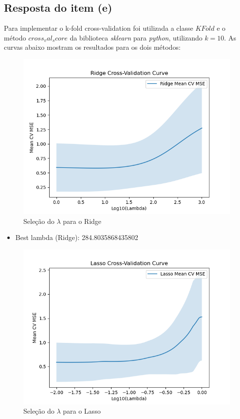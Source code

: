 \subsection{Resposta do item (e)}
Para implementar o k-fold cross-validation foi utilizada a classe $KFold$ e o método $cross_val_score$ da biblioteca \textit{sklearn} para \textit{python}, utilizando $k=10$.
As curvas abaixo mostram os resultados para os dois métodos:

\begin{figure}[H]
    \centering
    \caption{Seleção do $\lambda$ para o Ridge}
    \includegraphics[width=12cm]{ridge.png}
\end{figure}

\begin{itemize}
    \item Best lambda (Ridge): 284.8035868435802
\end{itemize}

\begin{figure}[H]
    \centering
    \caption{Seleção do $\lambda$ para o Lasso}
    \includegraphics[width=12cm]{lasso.png}
\end{figure}

